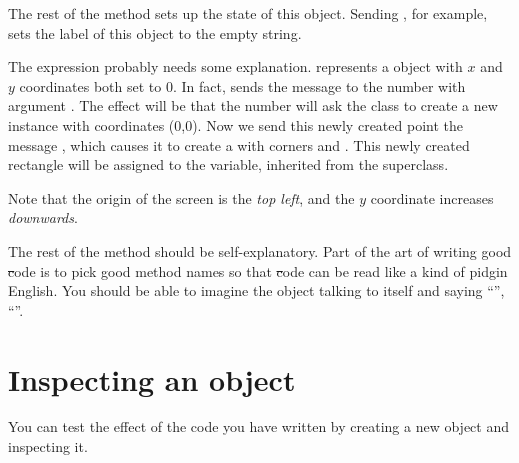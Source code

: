 \documentclass[a4paper,10pt,twoside]{book}
\begin{document}
The rest of the method sets up the state of this object.
Sending , for example, sets the label of this object to the empty string.

The expression  probably needs some explanation. 
 represents a  object with $x$ and $y$ coordinates both set to 0.
In fact,  sends the message 
to the number  with argument .
The effect will be that the number  will ask the  class to create a new instance with coordinates (0,0).
Now we send this newly created point the message , which causes it to create a  with corners  and .
This newly created rectangle will be assigned to the  variable, inherited from the superclass.

Note that the origin of the \pharo screen is the \emph{top left}, and the $y$ coordinate increases \emph{downwards}.

The rest of the method should be self-explanatory.
Part of the art of writing good \st code is to pick good method names so that \st code can be read like a kind of pidgin English.
You should be able to imagine the object talking to itself and saying ``'', ``''.

\section{Inspecting an object}

You can test the effect of the code you have written by creating a new  object and inspecting it.

\end{document}
